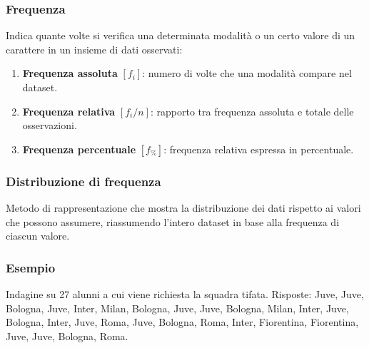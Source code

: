 \documentclass[a4paper,11pt]{article}
\begin{document}
\subsubsection{Frequenza}
Indica quante volte si verifica una determinata modalità o un certo valore di un carattere in un insieme di dati osservati:
\begin{enumerate}
    \item \textbf{Frequenza assoluta} $[f_i]$: numero di volte che una modalità compare nel dataset.
    \item \textbf{Frequenza relativa} $[f_i/n]$: rapporto tra frequenza assoluta e totale delle osservazioni.
    \item \textbf{Frequenza percentuale} $[f_\%]$: frequenza relativa espressa in percentuale.
\end{enumerate}

\subsubsection{Distribuzione di frequenza}
Metodo di rappresentazione che mostra la distribuzione dei dati rispetto ai valori che possono assumere, riassumendo l'intero dataset in base alla frequenza di ciascun valore.

\subsubsection{Esempio}
Indagine su 27 alunni a cui viene richiesta la squadra tifata. Risposte: Juve, Juve, Bologna, Juve, Inter, Milan, Bologna, Juve, Juve, Bologna, Milan, Inter, Juve, Bologna, Inter, Juve, Roma, Juve, Bologna, Roma, Inter, Fiorentina, Fiorentina, Juve, Juve, Bologna, Roma.
\end{document}
